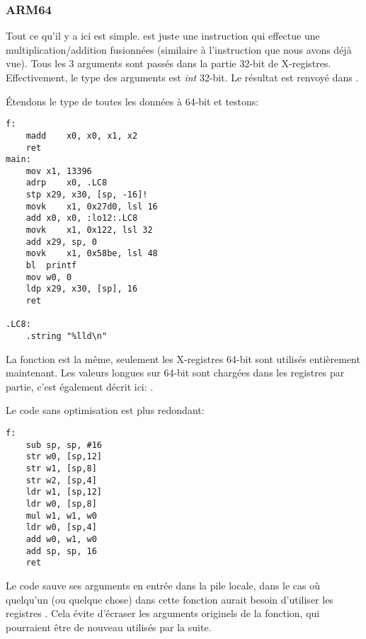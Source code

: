 \subsubsection{ARM64}


Tout ce qu'il y a ici est simple.
 est juste une instruction qui effectue une multiplication/addition fusionnées
(similaire à l'instruction  que nous avons déjà vue).
Tous les 3 arguments sont passés dans la partie 32-bit de X-registres.
Effectivement, le type des arguments est \emph{int} 32-bit.
Le résultat est renvoyé dans .



Étendons le type de toutes les données à 64-bit  et testons:



\begin{lstlisting}[style=customasmARM]
f:
	madd	x0, x0, x1, x2
	ret
main:
	mov	x1, 13396
	adrp	x0, .LC8
	stp	x29, x30, [sp, -16]!
	movk	x1, 0x27d0, lsl 16
	add	x0, x0, :lo12:.LC8
	movk	x1, 0x122, lsl 32
	add	x29, sp, 0
	movk	x1, 0x58be, lsl 48
	bl	printf
	mov	w0, 0
	ldp	x29, x30, [sp], 16
	ret

.LC8:
	.string	"%lld\n"
\end{lstlisting}

La fonction \ttf{} est la même, seulement les X-registres 64-bit sont utilisés entièrement
maintenant.
Les valeurs longues sur 64-bit sont chargées dans les registres par partie, c'est
également décrit ici: .


Le code sans optimisation est plus redondant:

\begin{lstlisting}[style=customasmARM]
f:
	sub	sp, sp, #16
	str	w0, [sp,12]
	str	w1, [sp,8]
	str	w2, [sp,4]
	ldr	w1, [sp,12]
	ldr	w0, [sp,8]
	mul	w1, w1, w0
	ldr	w0, [sp,4]
	add	w0, w1, w0
	add	sp, sp, 16
	ret
\end{lstlisting}

Le code sauve ses arguments en entrée dans la pile locale, dans le cas où quelqu'un
(ou quelque chose) dans cette fonction aurait besoin d'utiliser les registres .
Cela évite d'écraser les arguments originels de la fonction, qui pourraient être
de nouveau utilisés par la suite.

